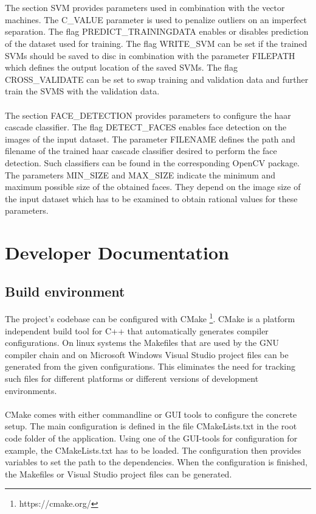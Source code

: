\\
\\
The section SVM provides parameters used in combination with the vector machines. The C\_VALUE parameter is used to penalize outliers on an imperfect separation. The flag PREDICT\_TRAININGDATA enables or disables prediction of the dataset used for training. The flag WRITE\_SVM can be set if the trained SVMs should be saved to disc in combination with the parameter FILEPATH which defines the output location of the saved SVMs. The flag CROSS\_VALIDATE can be set to swap training and validation data and further train the SVMS with the validation data.
\\
\\
The section FACE\_DETECTION provides parameters to configure the haar cascade classifier. The flag DETECT\_FACES enables face detection on the images of the input dataset. The parameter FILENAME defines the path and filename of the trained haar cascade classifier desired to perform the face detection. Such classifiers can be found in the corresponding OpenCV package. The parameters MIN\_SIZE and MAX\_SIZE indicate the minimum and maximum possible size of the obtained faces. They depend on the image size of the input dataset which has to be examined to obtain rational values for these parameters.


\section{Developer Documentation}\label{sec:devdoc}


\subsection{Build environment}

The project’s codebase can be configured with CMake \footnote{https://cmake.org/}. CMake is a platform independent build tool for C++ that automatically generates compiler configurations. On linux systems the Makefiles that are used by the GNU compiler chain and on Microsoft Windows Visual Studio project files can be generated from the given configurations. This eliminates the need for tracking such files for different platforms or different versions of development environments.
\\
\\
CMake comes with either commandline or GUI tools to configure the concrete setup. The main configuration is defined in the file CMakeLists.txt in the root code folder of the application. Using one of the GUI-tools for configuration for example, the CMakeLists.txt has to be loaded. The configuration then provides variables to set the path to the dependencies. When the configuration is finished, the Makefiles or Visual Studio project files can be generated.


